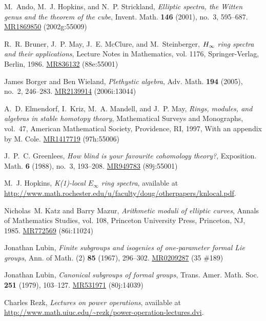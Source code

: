 \documentclass{gtpart}
\theoremstyle{definition}
\theoremstyle{remark}
\begin{document}
%
%

\newcommand{\MRn}[2]{\href{http://www.ams.org/mathscinet-getitem?mr=#1}{MR#1} #2}
\begin{thebibliography}

M.~Ando, M.~J. Hopkins, and N.~P. Strickland, \emph{Elliptic spectra, the
  {W}itten genus and the theorem of the cube}, Invent. Math. \textbf{146}
  (2001), no.~3, 595--687. \MRn{1869850}{(2002g:55009)}

R.~R. Bruner, J.~P. May, J.~E. McClure, and M.~Steinberger, \emph{{$H\sb \infty
  $} ring spectra and their applications}, Lecture Notes in Mathematics, vol.
  1176, Springer-Verlag, Berlin, 1986. \MRn{836132}{(88e:55001)}

James Borger and Ben Wieland, \emph{Plethystic algebra}, Adv. Math.
  \textbf{194} (2005), no.~2, 246--283. \MRn{2139914}{(2006i:13044)}

A.~D. Elmendorf, I.~Kriz, M.~A. Mandell, and J.~P. May, \emph{Rings, modules,
  and algebras in stable homotopy theory}, Mathematical Surveys and Monographs,
  vol.~47, American Mathematical Society, Providence, RI, 1997, With an
  appendix by M. Cole. \MRn{1417719}{(97h:55006)}

J.~P.~C. Greenlees, \emph{How blind is your favourite cohomology theory?},
  Exposition. Math. \textbf{6} (1988), no.~3, 193--208. \MRn{949783}{(89j:55001)}

M.~J. Hopkins, \emph{K(1)-local ${E}_\infty$ ring spectra}, available at
  \url{http://www.math.rochester.edu/u/faculty/doug/otherpapers/knlocal.pdf}.

Nicholas~M. Katz and Barry Mazur, \emph{Arithmetic moduli of elliptic curves},
  Annals of Mathematics Studies, vol. 108, Princeton University Press,
  Princeton, NJ, 1985. \MRn{772569}{(86i:11024)}

Jonathan Lubin, \emph{Finite subgroups and isogenies of one-parameter formal
  {L}ie groups}, Ann. of Math. (2) \textbf{85} (1967), 296--302. \MRn{0209287}{(35 \#189)}

Jonathan Lubin, \emph{Canonical subgroups of formal groups}, Trans. Amer. Math.
  Soc. \textbf{251} (1979), 103--127. \MRn{531971}{(80j:14039)}

Charles Rezk, \emph{Lectures on power operations}, available at
  \url{http://www.math.uiuc.edu/~rezk/power-operation-lectures.dvi}.


\end{thebibliography}
\end{document}
